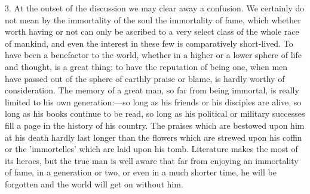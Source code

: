 \documentclass[11pt,letter]{article}
\begin{document}
\par  3. At the outset of the discussion we may clear away a confusion. We certainly do not mean by the immortality of the soul the immortality of fame, which whether worth having or not can only be ascribed to a very select class of the whole race of mankind, and even the interest in these few is comparatively short-lived. To have been a benefactor to the world, whether in a higher or a lower sphere of life and thought, is a great thing: to have the reputation of being one, when men have passed out of the sphere of earthly praise or blame, is hardly worthy of consideration. The memory of a great man, so far from being immortal, is really limited to his own generation:—so long as his friends or his disciples are alive, so long as his books continue to be read, so long as his political or military successes fill a page in the history of his country. The praises which are bestowed upon him at his death hardly last longer than the flowers which are strewed upon his coffin or the 'immortelles' which are laid upon his tomb. Literature makes the most of its heroes, but the true man is well aware that far from enjoying an immortality of fame, in a generation or two, or even in a much shorter time, he will be forgotten and the world will get on without him.
\end{document}
